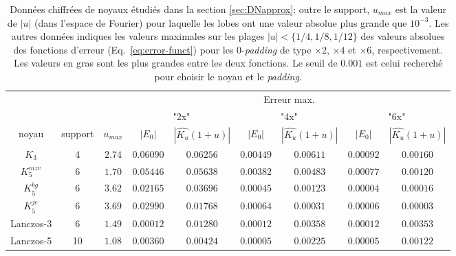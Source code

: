 \documentclass[11pt,twoside]{article}
\begin{document}
\begin{table}
\small
\centering
\begin{tabular}{c|c|c|cc|cc|cc}
\toprule
         &         &           & \multicolumn{6}{c}{Erreur max.} \\ 
         &         &           & \multicolumn{2}{c}{"2x"} & \multicolumn{2}{|c}{"4x"} & \multicolumn{2}{|c}{"6x"} \\
noyau    & support & $u_{max}$  &   $|E_0|$ & $|\widehat{K_u}(1+u)|$ & $|E_0|$ & $|\widehat{K_u}(1+u)|$ & $|E_0|$ & $|\widehat{K_u}(1+u)|$  \\ \midrule
$K_3$    &   4     &  $2.74$   &   $0.06090$ &	 $\mathbf{0.06256}$ & $0.00449$ & 	 $\mathbf{0.00611}$ & $ 0.00092$ &  	$\mathbf{0.00160}$ \\
$K_5^{mzv}$ & 6    & $1.70$ &   $0.05446$ 	& $\mathbf{0.05638}$ & $0.00382$ & $\mathbf{0.00483}$ &  $0.00077$ 	 & $\mathbf{0.00120}$ \\
$K_5^{bg}$ & 6    & $3.62$ &   $0.02165$ 	& $\mathbf{0.03696}$ & $0.00045$ & $\mathbf{0.00123}$ &  $0.00004$ 	 & $\mathbf{0.00016}$ \\
$K_5^{je}$ & 6    & $3.69$ &   $0.02990$ 	& $\mathbf{0.01768}$ & $\mathbf{0.00064}$ & $0.00031$ &  $\mathbf{0.00006}$ 	 & $0.00003$ \\
Lanczos-3 & 6     &  $1.49$ &  $0.00012$ 	 & $\mathbf{0.01280}$ & $0.00012$ &  	$\mathbf{0.00358}$ & $0.00012$ &  	 $\mathbf{0.00353}$ \\
Lanczos-5 & 10    &  $1.08$ & $0.00360$  &  $\mathbf{0.00424}$ & $0.00005$ & $\mathbf{0.00225}$ & $0.00005$ & 	 $\mathbf{0.00122}$ \\
\bottomrule
\end{tabular}
\caption{Données chiffrées de noyaux étudiés dans la section \ref{sec:DNapprox}: outre le support, $u_{max}$ est la valeur de $|u|$ (dans l'espace de Fourier) pour laquelle les lobes ont une valeur absolue plus grande que $10^{-3}$. Les autres données indiques les valeurs maximales sur les plages $|u|<\{1/4,1/8,1/12\}$ des valeurs absolues des fonctions d'erreur (Eq.~\ref{eq:error-funct}) pour les 0-\textit{padding} de type $\times 2$, $\times 4$ et $\times 6$, respectivement. Les valeurs en gras sont les plus grandes entre les deux fonctions. Le seuil de $0.001$ est celui recherché pour choisir le noyau et le \textit{padding}.}
\label{tab-scoeff-bsplinecardapprox}
\end{table}
\end{document}
